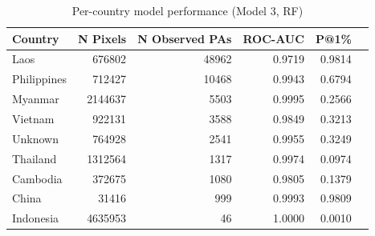 \begin{table}[h]
\centering
\begin{tabular}{lrrrrr}
\toprule
Country & N Pixels & N Observed PAs & ROC-AUC & P@1\% \\
\midrule
Laos & 676802 & 48962 & 0.9719 & 0.9814 \\
Philippines & 712427 & 10468 & 0.9943 & 0.6794 \\
Myanmar & 2144637 & 5503 & 0.9995 & 0.2566 \\
Vietnam & 922131 & 3588 & 0.9849 & 0.3213 \\
Unknown & 764928 & 2541 & 0.9955 & 0.3249 \\
Thailand & 1312564 & 1317 & 0.9974 & 0.0974 \\
Cambodia & 372675 & 1080 & 0.9805 & 0.1379 \\
China & 31416 & 999 & 0.9993 & 0.9809 \\
Indonesia & 4635953 & 46 & 1.0000 & 0.0010 \\
\bottomrule
\end{tabular}
\caption{Per-country model performance (Model 3, RF)}
\label{tab:country_breakdown_rf}
\end{table}
